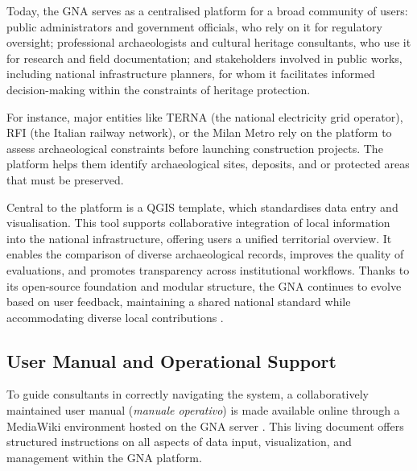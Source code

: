 \begin{spacing}{1.5}
Today, the GNA serves as a centralised platform for a broad community of users: public administrators and government officials, who rely on it for regulatory oversight; professional archaeologists and cultural heritage consultants, who use it for research and field documentation; and stakeholders involved in public works, including national infrastructure planners, for whom it facilitates informed decision-making within the constraints of heritage protection.

For instance, major entities like TERNA (the national electricity grid operator), RFI (the Italian railway network), or the Milan Metro rely on the platform to assess archaeological constraints before launching construction projects. The platform helps them identify archaeological sites, deposits, and or protected areas that must be preserved.

Central to the platform is a QGIS template, which standardises data entry and visualisation. This tool supports collaborative integration of local information into the national infrastructure, offering users a unified territorial overview. It enables the comparison of diverse archaeological records, improves the quality of evaluations, and promotes transparency across institutional workflows. Thanks to its open-source foundation and modular structure, the GNA continues to evolve based on user feedback, maintaining a shared national standard while accommodating diverse local contributions \citep{calandra_il_2023, boi_il_2023}.

\subsection{User Manual and Operational Support}
To guide consultants in correctly navigating the system, a collaboratively maintained user manual (\textit{manuale operativo}) is made available online through a MediaWiki environment hosted on the GNA server \citep{gna_wiki_2024}. This living document offers structured instructions on all aspects of data input, visualization, and management within the GNA platform.


\end{spacing}
